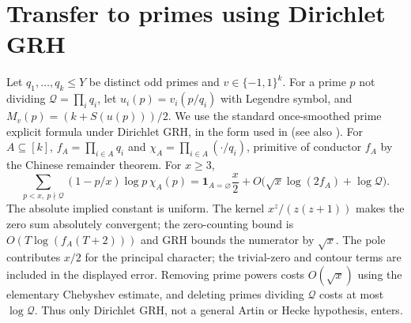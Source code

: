 \documentclass[11pt]{article}
\theoremstyle{remark}\newtheorem{remark}[theorem]{Remark}
\begin{document}
\section{Transfer to primes using Dirichlet GRH}
Let $q_1,\ldots,q_k\le Y$ be distinct odd primes and $v\in\{-1,1\}^k$. For a prime $p$ not dividing $\mathcal Q=\prod_i q_i$, let $u_i(p)=v_i(p/q_i)$ with Legendre symbol, and $M_v(p)=(k+S(u(p)))/2$. We use the standard once-smoothed prime explicit formula under Dirichlet GRH, in the form used in \cite[\texttt{dir:thm:signs}]{article} (see also \cite{bellaiche,mv}). For $A\subseteq[k]$, $f_A=\prod_{i\in A}q_i$ and $\chi_A=\prod_{i\in A}(\cdot/q_i)$, primitive of conductor $f_A$ by the Chinese remainder theorem. For $x\ge3$,
\begin{equation}\label{eq:prime}
 \sum_{p<x,\ p\nmid\mathcal Q}(1-p/x)\log p\,\chi_A(p)
 =\mathbf1_{A=\varnothing}\frac{x}{2}
 +O\bigl(\sqrt{x}\log(2f_A)+\log\mathcal Q\bigr).
\end{equation}
The absolute implied constant is uniform. The kernel $x^z/(z(z+1))$ makes the zero sum absolutely convergent; the zero-counting bound is $O(T\log(f_A(T+2)))$ and GRH bounds the numerator by $\sqrt{x}$. The pole contributes $x/2$ for the principal character; the trivial-zero and contour terms are included in the displayed error. Removing prime powers costs $O(\sqrt{x})$ using the elementary Chebyshev estimate, and deleting primes dividing $\mathcal Q$ costs at most $\log\mathcal Q$. Thus only Dirichlet GRH, not a general Artin or Hecke hypothesis, enters.
\end{document}
